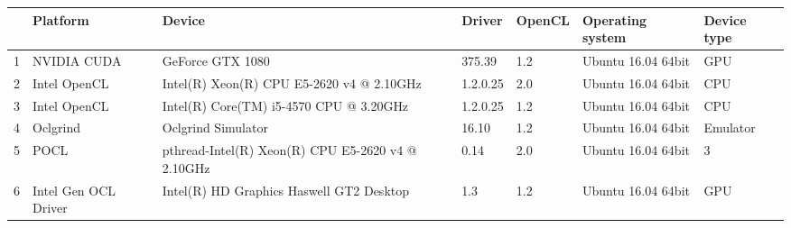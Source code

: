 \begin{tabular}{lllllll}
\toprule
{} &              Platform &                                             Device &    Driver & OpenCL &    Operating system & Device type \\
\midrule
1 &           NVIDIA CUDA &                                   GeForce GTX 1080 &    375.39 &    1.2 &  Ubuntu 16.04 64bit &         GPU \\
2 &          Intel OpenCL &          Intel(R) Xeon(R) CPU E5-2620 v4 @ 2.10GHz &  1.2.0.25 &    2.0 &  Ubuntu 16.04 64bit &         CPU \\
3 &          Intel OpenCL &            Intel(R) Core(TM) i5-4570 CPU @ 3.20GHz &  1.2.0.25 &    1.2 &  Ubuntu 16.04 64bit &         CPU \\
4 &              Oclgrind &                                 Oclgrind Simulator &     16.10 &    1.2 &  Ubuntu 16.04 64bit &    Emulator \\
5 &                  POCL &  pthread-Intel(R) Xeon(R) CPU E5-2620 v4 @ 2.10GHz &      0.14 &    2.0 &  Ubuntu 16.04 64bit &           3 \\
6 &  Intel Gen OCL Driver &           Intel(R) HD Graphics Haswell GT2 Desktop &       1.3 &    1.2 &  Ubuntu 16.04 64bit &         GPU \\
\bottomrule
\end{tabular}
